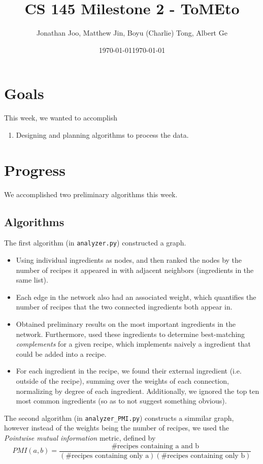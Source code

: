 \documentclass{article}
\date{\today}
\title{CS 145 Milestone 2 - ToMEto}
\author{Jonathan Joo, Matthew Jin, Boyu (Charlie) Tong, Albert Ge}
\date{\today} \\
\begin{document}
\maketitle

\section{Goals}
This week, we wanted to accomplish
\begin{enumerate}
    \item Designing and planning algorithms to process the data.
\end{enumerate}

\section{Progress}

We accomplished two preliminary algorithms this week.

\subsection{Algorithms}
The first algorithm (in \texttt{analyzer.py}) constructed a graph.
\begin{itemize}
    \item Using individual ingredients as nodes, and then ranked the nodes by the number of
recipes it appeared in with adjacent neighbors (ingredients in the same list).
    \item Each edge in the network also had an associated weight, which quantifies
the number of recipes that the two connected ingredients both appear in.
    \item Obtained preliminary results on the most 
important ingredients in the network. Furthermore, used 
these ingredients to determine best-matching \textit{complements}
for a given recipe, which implements naively a ingredient
that could be added into a recipe. 
    \item For 
each ingredient in the recipe, we found their external
ingredient (i.e. outside of the recipe), summing over
the weights of each connection, normalizing by degree of each ingredient.
Additionally,
we ignored the top ten most common ingredients (so as to 
not suggest something obvious).
\end{itemize}
The second algorithm (in \texttt{analyzer\_PMI.py}) constructs a simmilar
graph, however instead of the weights being the number of recipes, 
we used the \textit{Pointwise mutual information} metric, defined by
\[
    PMI(a,b) = \frac{\text{\# recipes containing a and b}}{
    (\text{\# recipes containing only a})(\text{\# recipes containing only b})}
\]
\end{document}
